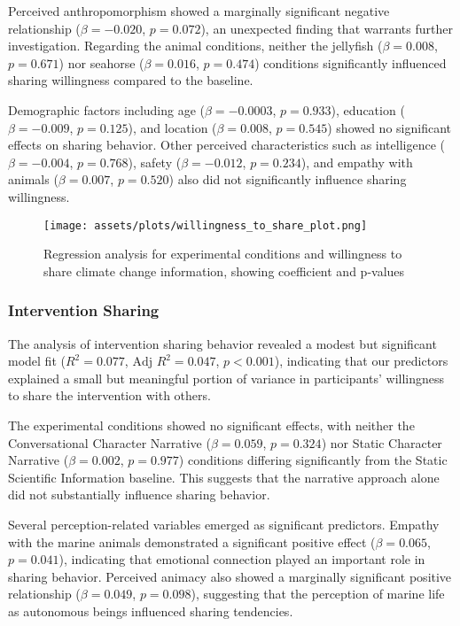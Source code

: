 \documentclass[sigconf, nonacm]{acmart}
\begin{document}
Perceived anthropomorphism showed a marginally significant negative relationship ($\beta = -0.020$, $p = 0.072$), an unexpected finding that warrants further investigation. Regarding the animal conditions, neither the jellyfish ($\beta = 0.008$, $p = 0.671$) nor seahorse ($\beta = 0.016$, $p = 0.474$) conditions significantly influenced sharing willingness compared to the baseline.

Demographic factors including age ($\beta = -0.0003$, $p = 0.933$), education ($\beta = -0.009$, $p = 0.125$), and location ($\beta = 0.008$, $p = 0.545$) showed no significant effects on sharing behavior. Other perceived characteristics such as intelligence ($\beta = -0.004$, $p = 0.768$), safety ($\beta = -0.012$, $p = 0.234$), and empathy with animals ($\beta = 0.007$, $p = 0.520$) also did not significantly influence sharing willingness.

\begin{figure}
    \centering
    \texttt{[image: assets/plots/willingness\_to\_share\_plot.png]}
    \caption{Regression analysis for experimental conditions and willingness to share climate change information, showing coefficient and p-values}
    \label{fig:sharing_post}
\end{figure}


\subsubsection{Intervention Sharing}

The analysis of intervention sharing behavior revealed a modest but significant model fit ($R^2 = 0.077$, $\text{Adj } R^2 = 0.047$, $p < 0.001$), indicating that our predictors explained a small but meaningful portion of variance in participants' willingness to share the intervention with others.

The experimental conditions showed no significant effects, with neither the Conversational Character Narrative ($\beta = 0.059$, $p = 0.324$) nor Static Character Narrative ($\beta = 0.002$, $p = 0.977$) conditions differing significantly from the Static Scientific Information baseline. This suggests that the narrative approach alone did not substantially influence sharing behavior.

Several perception-related variables emerged as significant predictors. Empathy with the marine animals demonstrated a significant positive effect ($\beta = 0.065$, $p = 0.041$), indicating that emotional connection played an important role in sharing behavior. Perceived animacy also showed a marginally significant positive relationship ($\beta = 0.049$, $p = 0.098$), suggesting that the perception of marine life as autonomous beings influenced sharing tendencies.
\end{document}
